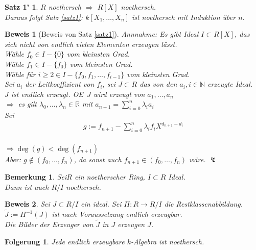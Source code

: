\documentclass[a4paper,12pt]{report}
\theoremstyle{break}
\newtheorem{Bem}[Def]{Bemerkung}
\newtheorem{Folg}[Def]{Folgerung}
\theoremstyle{nonumberbreak}
\newtheorem{nnSatz1}{Satz 1'} %
\newtheorem{Bew}{Beweis}
\theoremstyle{nonumberplain}
\newcommand{\R}{\mathbb{R}}
\newcommand{\N}{\mathbb{N}}
\renewcommand{\OE}{O\!\!E~}
\begin{document}
\begin{nnSatz1}
$R$ noethersch $\Rightarrow$ $R[X]$ noethersch.\\
Daraus folgt Satz \ref{satz1}: $k[X_1,\dots ,X_n]$ ist noethersch mit Induktion \"uber $n$.
\end{nnSatz1}

\begin{Bew}[Beweis von Satz \ref{satz1}]
\emph{Annnahme:} Es gibt Ideal $I\subset R[X]$, das sich nicht von endlich vielen Elementen erzeugen l\"asst.\\
W\"ahle $f_0 \in I-\{0\}$ vom kleinsten Grad.\\
W\"ahle $f_1 \in I-\{f_0\}$ vom kleinsten Grad.\\
W\"ahle f\"ur $i\ge2\in I-\{f_0,f_1,\dots ,f_{i-1}\}$ vom kleinsten Grad.\\
Sei $a_i$ der Leitkoeffizient von $f_i$, sei $J\subset R$ das von den $a_i,i\in \N$ erzeugte Ideal.\\
$J$ ist endlich erzeugt. \OE $J$ wird erzeugt von $a_1,\dots ,a_n$\\
$\Rightarrow$ es gilt $\lambda_0,\dots ,\lambda_n \in \R$ mit $a_{n+1}=\sum_{i=0}^n\lambda_i a_i$\\
Sei \begin{align*}g:= f_{n+1}-\sum_{i=0}^n \lambda_i f_i X^{d_{n+1}-d_i}\end{align*}\\
$\Rightarrow \deg(g) <\deg(f_{n+1})$\\
Aber: $g\notin (f_0,\dots ,f_n)$, da sonst auch $f_{n+1} \in(f_0,\dots ,f_n)$ w\"are. $\lightning$
\end{Bew}

\begin{Bem}\label{bem1.8}
Sei$R$ ein noetherscher Ring, $I\subset R$ Ideal.\\
Dann ist auch $R/I$ noethersch.
\end{Bem}

\begin{Bew}
Sei $J \subset R/I$ ein ideal. Sei $\Pi:R \to R/I$ die Restklassenabbildung.\\
$\tilde{J} := \Pi^{-1}(J)$ ist nach Voraussetzung endlich erzeugbar.\\
Die Bilder der Erzeuger von $\tilde{J}$ in $J$ erzeugen $J$.
\end{Bew}

\begin{Folg}
Jede endlich erzeugbare $k$-Algebra ist noethersch.
\end{Folg}
\end{document}
